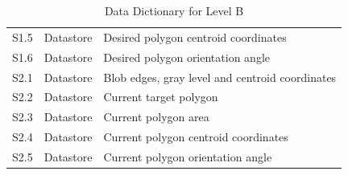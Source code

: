 \begin{table}[!htb]
\begin{tabular}{lll}
		S1.5 & Datastore & Desired polygon centroid coordinates \\
		S1.6 & Datastore & Desired polygon orientation angle \\
		S2.1 & Datastore & Blob edges, gray level and centroid coordinates \\
		S2.2 & Datastore & Current target polygon  \\
		S2.3 & Datastore & Current polygon area \\
		S2.4 & Datastore & Current polygon centroid coordinates \\
		S2.5 & Datastore & Current polygon orientation angle \\		
		\bottomrule
	\end{tabular}
	\caption{Data Dictionary for Level B}
	\label{tab:DD-LB}
\end{table}